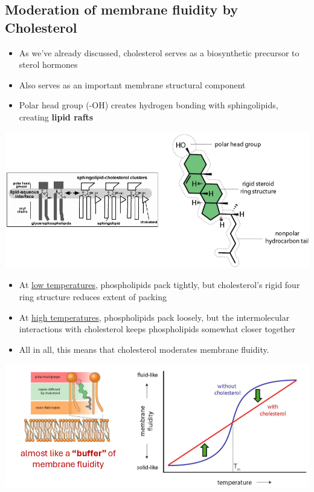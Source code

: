 \documentclass[10pt]{article}
\begin{document}
\subsection*{Moderation of membrane fluidity by Cholesterol}
\begin{itemize}
    \item As we've already discussed, cholesterol serves as a biosynthetic precursor to sterol hormones
    \item Also serves as an important membrane structural component
    \item Polar head group (-OH) creates hydrogen bonding with sphingolipids, creating \textbf{lipid rafts}
\end{itemize}
\begin{center}
    \includegraphics*[width=\textwidth]{L4_3.png}
\end{center}
\begin{itemize}
    \item At \underline{low temperatures}, phospholipids pack tightly, but cholesterol's rigid four ring structure reduces extent of packing
    \item At \underline{high temperatures}, phospholipids pack loosely, but the intermolecular interactions with cholesterol keeps phospholipids somewhat closer together
    \item All in all, this means that cholesterol moderates membrane fluidity.
\end{itemize}
\begin{center}
    \includegraphics*[width=\textwidth]{L4_4.png}
\end{center}
\end{document}
